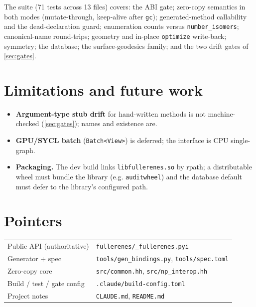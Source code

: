 \documentclass[11pt]{article}
\newcommand{\code}[1]{\lstinline[style=py]!#1!}
\begin{document}
The suite (71 tests across 13 files) covers: the ABI gate; zero-copy semantics in both
modes (mutate-through, keep-alive after \texttt{gc}); generated-method callability and the
dead-declaration guard; enumeration counts versus \code{number_isomers}; canonical-name
round-trips; geometry and in-place \code{optimize} write-back; symmetry; the database; the
surface-geodesics family; and the two drift gates of \autoref{sec:gates}.

\section{Limitations and future work}
\begin{itemize}[leftmargin=1.4em]
\item \textbf{Argument-type stub drift} for hand-written methods is not machine-checked
  (\autoref{sec:gates}); names and existence are.
\item \textbf{GPU/SYCL batch} (\texttt{Batch<View>}) is deferred; the interface is
  CPU single-graph.
\item \textbf{Packaging.} The dev build links \texttt{libfullerenes.so} by rpath; a
  distributable wheel must bundle the library (e.g. \texttt{auditwheel}) and the database
  default must defer to the library's configured path.
\end{itemize}

\section*{Pointers}
\begin{tabular}{@{}ll@{}}
Public API (authoritative) & \texttt{fullerenes/\_fullerenes.pyi} \\
Generator + spec           & \texttt{tools/gen\_bindings.py}, \texttt{tools/spec.toml} \\
Zero-copy core             & \texttt{src/common.hh}, \texttt{src/np\_interop.hh} \\
Build / test / gate config & \texttt{.claude/build-config.toml} \\
Project notes              & \texttt{CLAUDE.md}, \texttt{README.md} \\
\end{tabular}
\end{document}
